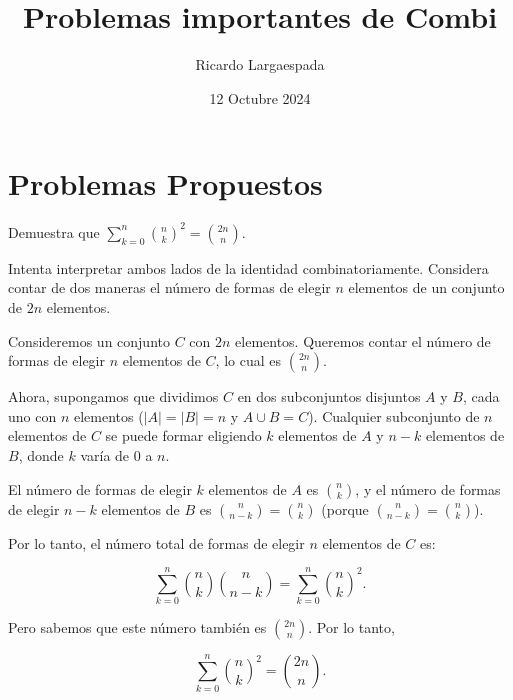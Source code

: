 \documentclass[11pt]{scrartcl}
\begin{document}
\title{Problemas importantes de Combi}
\author{Ricardo Largaespada}
\date{12 Octubre 2024}

\maketitle

\section{Problemas Propuestos}


\begin{problem}
Demuestra que $\sum_{k=0}^n \binom{n}{k}^2=\binom{2n}{n}.$
\begin{hint}
Intenta interpretar ambos lados de la identidad combinatoriamente. Considera contar de dos maneras el número de formas de elegir $n$ elementos de un conjunto de $2n$ elementos.
\begin{solu}
Consideremos un conjunto $C$ con $2n$ elementos. Queremos contar el número de formas de elegir $n$ elementos de $C$, lo cual es $\binom{2n}{n}$.

Ahora, supongamos que dividimos $C$ en dos subconjuntos disjuntos $A$ y $B$, cada uno con $n$ elementos ($|A| = |B| = n$ y $A \cup B = C$). Cualquier subconjunto de $n$ elementos de $C$ se puede formar eligiendo $k$ elementos de $A$ y $n - k$ elementos de $B$, donde $k$ varía de $0$ a $n$.

El número de formas de elegir $k$ elementos de $A$ es $\binom{n}{k}$, y el número de formas de elegir $n - k$ elementos de $B$ es $\binom{n}{n - k} = \binom{n}{k}$ (porque $\binom{n}{n - k} = \binom{n}{k}$).

Por lo tanto, el número total de formas de elegir $n$ elementos de $C$ es:

$$
\sum_{k=0}^n \binom{n}{k} \binom{n}{n - k} = \sum_{k=0}^n \binom{n}{k}^2.
$$

Pero sabemos que este número también es $\binom{2n}{n}$. Por lo tanto,

$$
\sum_{k=0}^n \binom{n}{k}^2 = \binom{2n}{n}.
$$

\end{solu}
\end{hint}
\end{problem}
\end{document}
